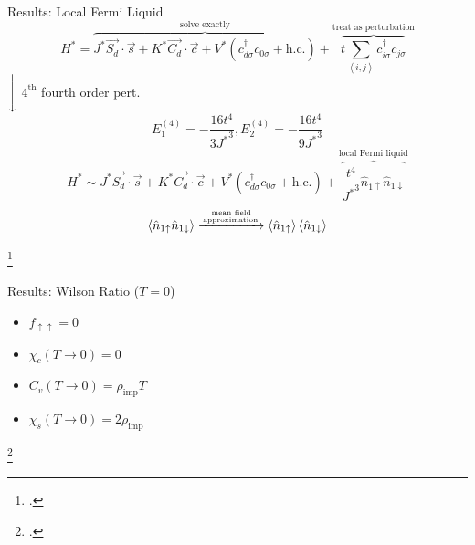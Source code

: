 \documentclass[aspectratio=169]{beamer}
\begin{document}
\begin{frame}[noframenumbering]{Results: Local Fermi Liquid}
	\[H^* = \overbrace{J^* \vec{S_d}\cdot\vec{s} + K^* \vec{C_d}\cdot\vec{c} + V^* \left( c^\dagger_{d\sigma}c_{0\sigma} + \text{h.c.} \right)}^\text{solve exactly} + \overbrace{t\sum_{\left<i,j \right>}c^\dagger_{i\sigma}c_{j\sigma}}^\text{treat as perturbation}\]
	\hspace*{0.5\textwidth}$\Bigg\downarrow$ \(4^\text{th}\) fourth order pert.
	\[E_1^{(4)} = -\frac{16t^4}{3{J^*}^3}, E_2^{(4)} = -\frac{16t^4}{9{J^*}^3}\]
	\[H^* \sim J^* \vec{S_d}\cdot\vec{s} + K^* \vec{C_d}\cdot\vec{c} + V^* \left( c^\dagger_{d\sigma}c_{0\sigma} + \text{h.c.} \right) + \overbrace{\frac{t^4}{{J^*}^3} \hat n_{1 \uparrow}\hat n_{1 \downarrow}}^\text{local Fermi liquid}\]
	\[ \left< \hat n_{1 \uparrow}\hat n_{1 \downarrow}\right> \xrightarrow{\text{mean field}\atop \text{approximation}} \left<\hat n_{1 \uparrow}\right>\left< \hat n_{1 \downarrow}\right>\]

\vspace*{-10pt}
\footcite{nozieres}
\end{frame}

\begin{frame}[noframenumbering]{Results: Wilson Ratio (\(T=0\))}
	\begin{center}
\end{center}
\vspace*{\fill}
\begin{minipage}{0.45\textwidth}
\begin{itemize}
	\item \(f_{\uparrow\uparrow} =0\)
	\item \(\chi_c(T\to 0) =0\)
\end{itemize}
\end{minipage}
\begin{minipage}{0.2\textwidth}
	\scalebox{2}{$\longrightarrow$}
\end{minipage}
\begin{minipage}{0.33\textwidth}
\begin{itemize}
	\item \(C_v(T\to 0) = \rho_\text{imp}T\)
	\item \(\chi_s(T \to 0) = 2\rho_\text{imp}\)
\end{itemize}
\end{minipage}
\vspace*{\fill}
\begin{center}
\end{center}
\footcite{hewsonp}
\end{frame}
\end{document}
